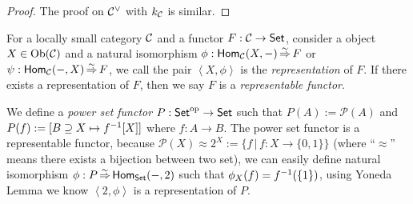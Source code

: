 \documentclass{article}
\begin{document}
\begin{proof}
	The proof on $\mathcal{C}^\vee$ with $k_{\mathcal{C}}$ is similar.
\end{proof}


\begin{defi}
		For a locally small category $\mathcal{C}$ and a functor $F:\mathcal{C}\to\mathsf{Set}$, consider a object $X\in\mathrm{Ob}(\mathcal{C})$ and a natural isomorphism $\phi:\mathsf{Hom}_{\mathcal{C}}(X,-)\mathop{\Rightarrow}\limits^{\sim} F$ or $\psi:\mathsf{Hom}_{\mathcal{C}}(-,X)\mathop{\Rightarrow}\limits^{\sim} F$, we call the pair $\left<X,\phi\right>$ is the \emph{representation} of $F$. If there exists a representation of $F$, then we say $F$ is a \emph{representable functor}.
\end{defi}


\begin{exm}
	We define a \emph{power set functor} $P:\mathsf{Set}^\mathrm{op}\to\mathsf{Set}$ such that $P(A):=\mathscr{P}(A)$ and $P(f):=[B\supseteq X\mapsto f^{-1}[X]]$ where $f:A\to B$. The power set functor is a representable functor, because $\mathscr{P}(X)\approx2^X:=\{f\,|\,f:X\to\{0,1\}\}$ (where ``$\approx$'' means there exists a bijection between two set), we can easily define natural isomorphism $\phi:P\mathop{\Rightarrow}\limits^{\sim}\mathsf{Hom_{Set}}(-,2)$ such that $\phi_X(f)=f^{-1}(\{1\})$, using Yoneda Lemma we know $\left<2,\phi\right>$ is a representation of $P$.
\end{exm}

\newpage

\end{document}
